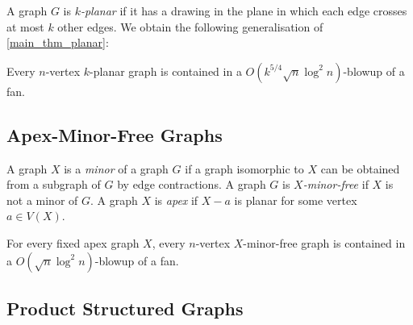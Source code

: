 \documentclass{patmorin}
\newcommand{\defin}[1]{\emph{\textcolor{brightmaroon}{#1}}}
\begin{document}
A graph $G$ is \defin{$k$-planar} if it has a drawing in the plane in which each edge crosses at most $k$ other edges.  We obtain the following generalisation of \cref{main_thm_planar}:

\begin{thm}\label{main_thm_k_planar}
  Every $n$-vertex $k$-planar graph is contained in a $O(k^{5/4}\sqrt{n}\log^2 n)$-blowup of a fan.
\end{thm}

%



\subsection{Apex-Minor-Free Graphs}

A graph $X$ is a \defin{minor} of a graph $G$ if a graph isomorphic to $X$ can be obtained from a subgraph of $G$ by edge contractions. A graph $G$ is \defin{$X$-minor-free} if $X$ is not a minor of $G$.
A graph $X$ is \defin{apex} if $X-a$ is planar for some vertex $a\in V(X)$.

\begin{thm}\label{main_thm_apexmf}
For every fixed apex graph $X$, every $n$-vertex $X$-minor-free graph is contained in a $O(\sqrt{n}\log^2 n)$-blowup of a fan.
\end{thm}



\subsection{Product Structured Graphs}
\end{document}
